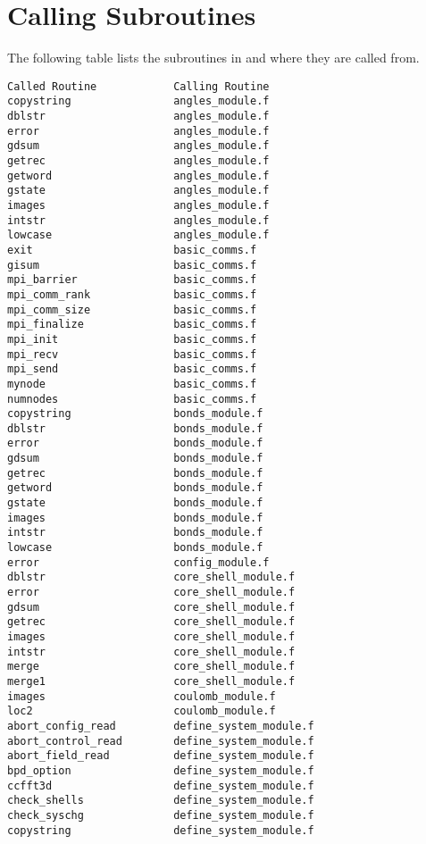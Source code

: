 \section*{Calling Subroutines}

The following table lists the subroutines in \D{} and where they are
called from.

\begin{verbatim}
Called Routine            Calling Routine
copystring                angles_module.f
dblstr                    angles_module.f
error                     angles_module.f
gdsum                     angles_module.f
getrec                    angles_module.f
getword                   angles_module.f
gstate                    angles_module.f
images                    angles_module.f
intstr                    angles_module.f
lowcase                   angles_module.f
exit                      basic_comms.f
gisum                     basic_comms.f
mpi_barrier               basic_comms.f
mpi_comm_rank             basic_comms.f
mpi_comm_size             basic_comms.f
mpi_finalize              basic_comms.f
mpi_init                  basic_comms.f
mpi_recv                  basic_comms.f
mpi_send                  basic_comms.f
mynode                    basic_comms.f
numnodes                  basic_comms.f
copystring                bonds_module.f
dblstr                    bonds_module.f
error                     bonds_module.f
gdsum                     bonds_module.f
getrec                    bonds_module.f
getword                   bonds_module.f
gstate                    bonds_module.f
images                    bonds_module.f
intstr                    bonds_module.f
lowcase                   bonds_module.f
error                     config_module.f
dblstr                    core_shell_module.f
error                     core_shell_module.f
gdsum                     core_shell_module.f
getrec                    core_shell_module.f
images                    core_shell_module.f
intstr                    core_shell_module.f
merge                     core_shell_module.f
merge1                    core_shell_module.f
images                    coulomb_module.f
loc2                      coulomb_module.f
abort_config_read         define_system_module.f
abort_control_read        define_system_module.f
abort_field_read          define_system_module.f
bpd_option                define_system_module.f
ccfft3d                   define_system_module.f
check_shells              define_system_module.f
check_syschg              define_system_module.f
copystring                define_system_module.f

\end{verbatim}
